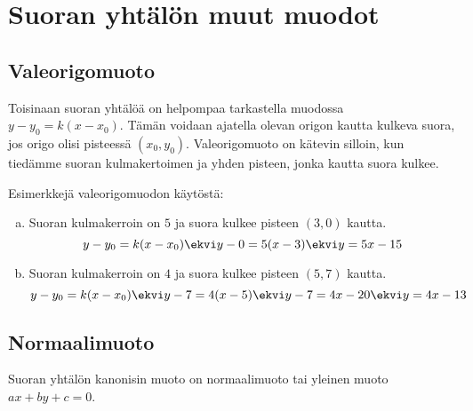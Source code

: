 \section{Suoran yhtälön muut muodot}


\subsection*{Valeorigomuoto} %

Toisinaan suoran yhtälöä on helpompaa tarkastella muodossa $y-y_0=k(x-x_0)$.
Tämän voidaan ajatella olevan origon kautta kulkeva suora, jos origo olisi
pisteessä $(x_0, y_0)$. Valeorigomuoto on kätevin silloin, kun tiedämme suoran
kulmakertoimen ja yhden pisteen, jonka kautta suora kulkee.

\begin{esimerkki}
    Esimerkkejä valeorigomuodon käytöstä:
    \begin{enumerate}[a)]
        \item Suoran kulmakerroin on $5$ ja suora kulkee pisteen $(3,0)$ kautta.
        \[y-y_0 = k(x-x_0) \ekvi y-0 = 5(x-3) \ekvi y = 5x-15\]
        \item Suoran kulmakerroin on $4$ ja suora kulkee pisteen $(5,7)$ kautta.
        \[y-y_0 = k(x-x_0) \ekvi y-7 = 4(x-5) \ekvi y-7 = 4x-20 \ekvi y = 4x-13\]
    \end{enumerate}
\end{esimerkki}

\subsection*{Normaalimuoto}

Suoran yhtälön kanonisin muoto on normaalimuoto tai yleinen muoto $ax+by+c=0$.
